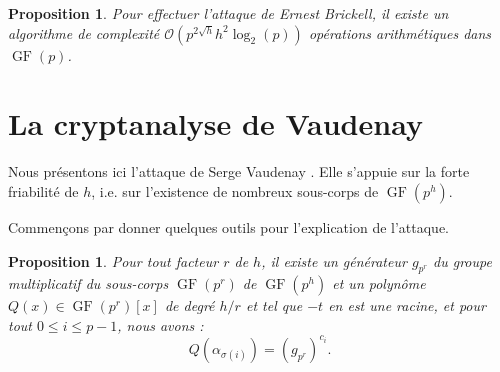 \documentclass[a4paper, titlepage]{article}
\newtheorem{prop}[theo]{Proposition}
\theoremstyle{definition}
\theoremstyle{remark}
\def\O{\mathcal O}
\def\gf{\operatorname{GF}}
\begin{document}
\begin{prop}
Pour effectuer l'attaque de Ernest Brickell, il existe un algorithme de complexité $\O(p^{2\sqrt{h}}h^2\log_2(p))$ opérations arithmétiques dans $\gf(p)$.
\end{prop}

\section{La cryptanalyse de Vaudenay}

Nous présentons ici l'attaque de Serge Vaudenay \cite{vaudenay2000}. Elle s'appuie sur la forte friabilité de $h$, i.e. sur l'existence de nombreux sous-corps de $\gf(p^h)$.

Commençons par donner quelques outils pour l'explication de l'attaque.

\begin{prop}\label{premierePropVaudenay}
Pour tout facteur $r$ de $h$, il existe un générateur $g_{p^r}$ du groupe multiplicatif du sous-corps $\gf(p^r)$ de $\gf(p^h)$ et un polynôme $Q(x) \in \gf(p^r)[x]$ de degré $h/r$ et tel que $-t$ en est une racine, et pour tout $0\leqslant i \leqslant p-1$, nous avons :
$$Q\left(\alpha_{\sigma(i)}\right) = (g_{p^r})^{c_i}.$$
\end{prop}
\end{document}
